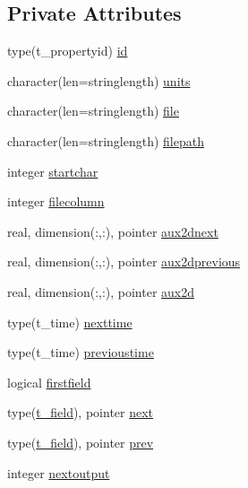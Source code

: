 \subsection*{Private Attributes}
\begin{DoxyCompactItemize}
\item 
type(t\+\_\+propertyid) \mbox{\hyperlink{structmoduletecnoceanascii_1_1t__field_abfebb5c29fa7903c5d7228ab037e6d5c}{id}}
\item 
character(len=stringlength) \mbox{\hyperlink{structmoduletecnoceanascii_1_1t__field_a0fcd912aafcd5259f4caa8c4ca6b3dd5}{units}}
\item 
character(len=stringlength) \mbox{\hyperlink{structmoduletecnoceanascii_1_1t__field_a89b43c945a5c11da7f5892a7c55b3800}{file}}
\item 
character(len=stringlength) \mbox{\hyperlink{structmoduletecnoceanascii_1_1t__field_a61b020c323e396bb7fd43550bcac2132}{filepath}}
\item 
integer \mbox{\hyperlink{structmoduletecnoceanascii_1_1t__field_a7579bf08038563806057c9c80aa5065f}{startchar}}
\item 
integer \mbox{\hyperlink{structmoduletecnoceanascii_1_1t__field_a4e754b28dabbce8f336bbab4e328127d}{filecolumn}}
\item 
real, dimension(\+:,\+:), pointer \mbox{\hyperlink{structmoduletecnoceanascii_1_1t__field_af4207198546370d78a102e571ecbf29f}{aux2dnext}}
\item 
real, dimension(\+:,\+:), pointer \mbox{\hyperlink{structmoduletecnoceanascii_1_1t__field_a9fc6dbbce100f8854eb7ee8cb7208193}{aux2dprevious}}
\item 
real, dimension(\+:,\+:), pointer \mbox{\hyperlink{structmoduletecnoceanascii_1_1t__field_a7180a75ed08a8793b96d90b1a502ceda}{aux2d}}
\item 
type(t\+\_\+time) \mbox{\hyperlink{structmoduletecnoceanascii_1_1t__field_a3f476f718d06d9a645ae085986e21bee}{nexttime}}
\item 
type(t\+\_\+time) \mbox{\hyperlink{structmoduletecnoceanascii_1_1t__field_adfca84adc4eb52b407682354b2ff9ba1}{previoustime}}
\item 
logical \mbox{\hyperlink{structmoduletecnoceanascii_1_1t__field_a9085dc7912567f60cb4b84cc0b7112d0}{firstfield}}
\item 
type(\mbox{\hyperlink{structmoduletecnoceanascii_1_1t__field}{t\+\_\+field}}), pointer \mbox{\hyperlink{structmoduletecnoceanascii_1_1t__field_a28cc6360af2e7ac9fe23a8f9cc9f9d3c}{next}}
\item 
type(\mbox{\hyperlink{structmoduletecnoceanascii_1_1t__field}{t\+\_\+field}}), pointer \mbox{\hyperlink{structmoduletecnoceanascii_1_1t__field_a84903d700fb7a9b3e39421face369644}{prev}}
\item 
integer \mbox{\hyperlink{structmoduletecnoceanascii_1_1t__field_a1b771374c90865e9d32cfe42b0c5ec40}{nextoutput}}
\end{DoxyCompactItemize}


